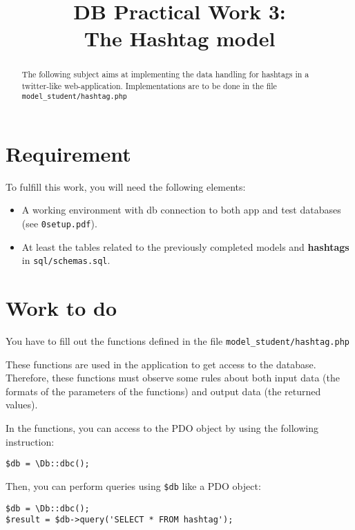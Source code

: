 \documentclass[twoside,a4paper,12pt]{article}
\title{DB Practical Work 3:\\The Hashtag model}
\date{}
\begin{document}
\maketitle

\begin{abstract}
  The following subject aims at implementing the data handling for hashtags in a twitter-like web-application. Implementations are to be done in the file \texttt{model\_student/hashtag.php}
\end{abstract}

\tableofcontents

\clearpage

\section{Requirement}
To fulfill this work, you will need the following elements:

\begin{itemize}
\item A working environment with db connection to both app and test databases (see \texttt{0setup.pdf}).
\item At least the tables related to the previously completed models and \textbf{hashtags} in \texttt{sql/schemas.sql}.
\end{itemize}

\section{Work to do}
You have to fill out the functions defined in the file \texttt{model\_student/hashtag.php}

These functions are used in the application to get access to the database. Therefore, these functions must observe some rules about both input data (the formats of the parameters of the functions) and output data (the returned values).

In the functions, you can access to the PDO object by using the following instruction:

\begin{lstlisting}
$db = \Db::dbc();
\end{lstlisting}

Then, you can perform queries using \texttt{\$db} like a PDO object:
\begin{lstlisting}
$db = \Db::dbc();
$result = $db->query('SELECT * FROM hashtag');
\end{lstlisting}
\end{document}
